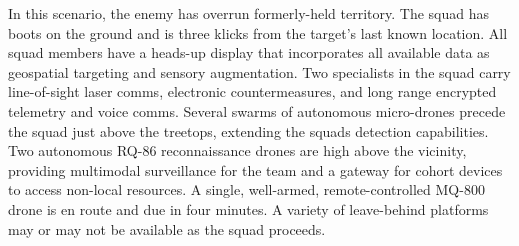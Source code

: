 In this scenario, the enemy has overrun formerly-held territory.
The squad has boots on the ground and is three klicks from the target's last known location.
All squad members have a heads-up display that incorporates all available data as geospatial targeting and sensory augmentation.
Two specialists in the squad carry line-of-sight laser comms, electronic countermeasures, and long range encrypted telemetry and voice comms.
Several swarms of autonomous micro-drones precede the squad just above the treetops, extending the squads detection capabilities.
Two autonomous RQ-86 reconnaissance drones are high above the vicinity, providing multimodal surveillance for the team and a gateway for cohort devices to access non-local resources.
A single, well-armed, remote-controlled MQ-800 drone is en route and due in four minutes.
A variety of leave-behind platforms may or may not be available as the squad proceeds.